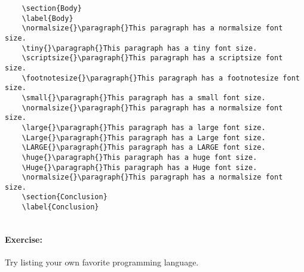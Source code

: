 \begin{lstlisting}
    \section{Body}
    \label{Body}
    \normalsize{}\paragraph{}This paragraph has a normalsize font size.
    \tiny{}\paragraph{}This paragraph has a tiny font size.
    \scriptsize{}\paragraph{}This paragraph has a scriptsize font size.
    \footnotesize{}\paragraph{}This paragraph has a footnotesize font size.
    \small{}\paragraph{}This paragraph has a small font size.
    \normalsize{}\paragraph{}This paragraph has a normalsize font size.
    \large{}\paragraph{}This paragraph has a large font size.
    \Large{}\paragraph{}This paragraph has a Large font size.
    \LARGE{}\paragraph{}This paragraph has a LARGE font size.
    \huge{}\paragraph{}This paragraph has a huge font size.
    \Huge{}\paragraph{}This paragraph has a Huge font size.
    \normalsize{}\paragraph{}This paragraph has a normalsize font size.
    \section{Conclusion}
    \label{Conclusion}
    
\end{lstlisting}
        
        \paragraph{Exercise:} Try listing your own favorite programming language.
